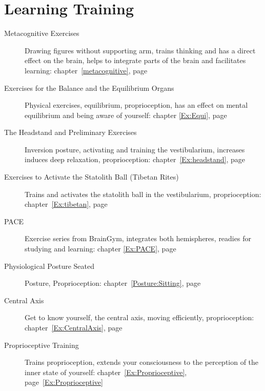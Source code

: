 \documentclass[../main.tex]{subfiles}
\begin{document}
\section{Learning Training}
\begin{description} 
\item[Metacognitive Exercises] Drawing figures without supporting arm, trains thinking and has a direct effect on the brain, helps to integrate parts of the brain and facilitates learning: chapter~\ref{metacognitive}, page~\pageref{metacognitive} %
\item[Exercises for the Balance and the Equilibrium Organs] Physical exer\-ci\-ses, equilibrium, proprioception, has an effect on mental equilibrium and being aware of yourself: chapter \ref{Ex:Equi}, page~\pageref{Ex:Equi} %
\item[The Headstand and Preliminary Exercises] Inversion posture, activating and training the vestibularium, increases induces deep relaxation, proprioception: chapter~\ref{Ex:headstand}, page~\pageref{Ex:headstand} %
\item[Exercises to Activate the Statolith Ball (Tibetan Rites)] Trains and activates the statolith ball in the vestibularium, proprioception:
  chapter~\ref{Ex:tibetan}, page~\pageref{Ex:tibetan} %
\item[PACE] Exercise series from BrainGym, integrates both hemispheres, readies for studying and learning: chapter \ref{Ex:PACE}, page \pageref{Ex:PACE} %
\item[Physiological Posture Seated] Posture, Proprioception: chapter~\ref{Posture:Sitting}, page~\pageref{Posture:Sitting} %
\item[Central Axis] Get to know yourself, the central axis, moving efficiently, proprioception: chapter~\ref{Ex:CentralAxis}, page~\pageref{Ex:CentralAxis}
\item[Proprioceptive Training] Trains proprioception, extends your consciousness to the perception of the inner state of yourself: chapter~\ref{Ex:Proprioceptive}, page~\ref{Ex:Proprioceptive} %
\end{description}
\end{document}
